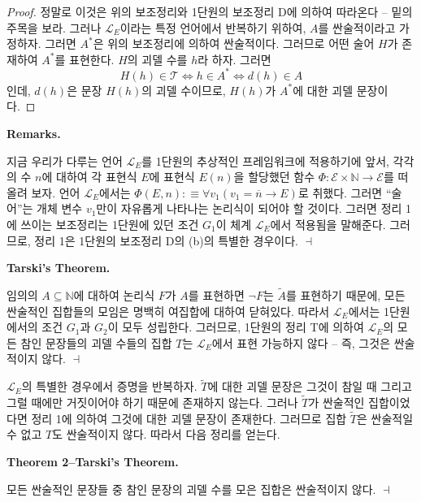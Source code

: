 \documentclass[12pt]{paper}
\newenvironment{context}[1][]
{ \noindent \textbf{{#1}.}
}
{ \hfill $ \dashv $
}
\begin{document}
  \begin{proof}
    정말로 이것은 위의 보조정리와 1단원의 보조정리 D에 의하여 따라온다 -- 밑의 주목을 보라.
    그러나 $\mathcal{L}_{E}$이라는 특정 언어에서 반복하기 위하여, $A$를 싼술적이라고 가정하자.
    그러면 $A^{*}$은 위의 보조정리에 의하여 싼술적이다.
    그러므로 어떤 술어 $H$가 존재하여 $A^{*}$를 표현한다.
    $H$의 괴델 수를 $h$라 하자.
    그러면 $$H \left( h \right) \in \mathcal{T} \iff h \in A^{*} \iff d \left( h \right) \in A$$인데,
    $d \left( h \right)$은 문장 $H \left( h \right)$의 괴델 수이므로,
    $H \left( h \right)$가 $A^{*}$에 대한 괴델 문장이다.
  \end{proof}

  \begin{context}[Remarks]
    지금 우리가 다루는 언어 $\mathcal{L}_{E}$를 1단원의 추상적인 프레임워크에 적용하기에 앞서,
    각각의 수 $n$에 대하여 각 표현식 $E$에 표현식 $E \left( n \right)$을 할당했던 함수 $\Phi : \mathcal{E} \times \mathbb{N} \to \mathcal{E}$를 떠올려 보자.
    언어 $\mathcal{L}_{E}$에서는 $\Phi \left( E , n \right) : \equiv \forall v_1 \left( v_1 = \overline{n} \rightarrow E \right)$로 취했다.
    그러면 ``술어''는 개체 변수 $v_1$만이 자유롭게 나타나는 논리식이 되어야 할 것이다.
    그러면 정리 1에 쓰이는 보조정리는 1단원에 있던 조건 $G_1$이 체계 $\mathcal{L}_{E}$에서 적용됨을 말해준다.
    그러므로, 정리 1은 1단원의 보조정리 D의 (b)의 특별한 경우이다.
  \end{context}

  \begin{context}[Tarski's Theorem]
    임의의 $A \subseteq \mathbb{N}$에 대하여 논리식 $F$가 $A$를 표현하면 $\lnot F$는 $\tilde{A}$를 표현하기 때문에,
    모든 싼술적인 집합들의 모임은 명백히 여집합에 대하여 닫혀있다.
    따라서 $\mathcal{L}_{E}$에서는 1단원에서의 조건 $G_1$과 $G_2$이 모두 성립한다.
    그러므로, 1단원의 정리 T에 의하여 $\mathcal{L}_{E}$의 모든 참인 문장들의 괴델 수들의 집합 $T$는 $\mathcal{L}_{E}$에서 표현 가능하지 않다 --
    즉, 그것은 싼술적이지 않다.
  \end{context}

  $\mathcal{L}_{E}$의 특별한 경우에서 증명을 반복하자.
  $\tilde{T}$에 대한 괴델 문장은 그것이 참일 때 그리고 그럴 때에만 거짓이어야 하기 때문에 존재하지 않는다.
  그러나 $\tilde{T}$가 싼술적인 집합이었다면 정리 1에 의하여 그것에 대한 괴델 문장이 존재한다.
  그러므로 집합 $\tilde{T}$은 싼술적일 수 없고 $T$도 싼술적이지 않다.
  따라서 다음 정리를 얻는다.

  \begin{context}[Theorem 2--Tarski's Theorem]
    모든 싼술적인 문장들 중 참인 문장의 괴델 수를 모은 집합은 싼술적이지 않다.
  \end{context}
\end{document}
